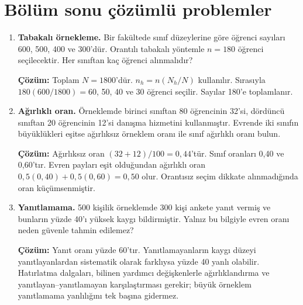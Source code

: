 \section{Bölüm sonu çözümlü problemler}

\begin{enumerate}
  \item \textbf{Tabakalı örnekleme.} Bir fakültede sınıf düzeylerine göre öğrenci sayıları 600, 500, 400 ve 300'dür. Orantılı tabakalı yöntemle $n=180$ öğrenci seçilecektir. Her sınıftan kaç öğrenci alınmalıdır?

  \textbf{Çözüm:} Toplam $N=1800$'dür. $n_h=n(N_h/N)$ kullanılır. Sırasıyla $180(600/1800)=60$, 50, 40 ve 30 öğrenci seçilir. Sayılar 180'e toplamlanır.

  \item \textbf{Ağırlıklı oran.} Örneklemde birinci sınıftan 80 öğrencinin 32'si, dördüncü sınıftan 20 öğrencinin 12'si danışma hizmetini kullanmıştır. Evrende iki sınıfın büyüklükleri eşitse ağırlıksız örneklem oranı ile sınıf ağırlıklı oranı bulun.

  \textbf{Çözüm:} Ağırlıksız oran $(32+12)/100=0{,}44$'tür. Sınıf oranları 0,40 ve 0,60'tır. Evren payları eşit olduğundan ağırlıklı oran $0{,}5(0{,}40)+0{,}5(0{,}60)=0{,}50$ olur. Orantısız seçim dikkate alınmadığında oran küçümsenmiştir.

  \item \textbf{Yanıtlamama.} 500 kişilik örneklemde 300 kişi ankete yanıt vermiş ve bunların yüzde 40'ı yüksek kaygı bildirmiştir. Yalnız bu bilgiyle evren oranı neden güvenle tahmin edilemez?

  \textbf{Çözüm:} Yanıt oranı yüzde 60'tır. Yanıtlamayanların kaygı düzeyi yanıtlayanlardan sistematik olarak farklıysa yüzde 40 yanlı olabilir. Hatırlatma dalgaları, bilinen yardımcı değişkenlerle ağırlıklandırma ve yanıtlayan--yanıtlamayan karşılaştırması gerekir; büyük örneklem yanıtlamama yanlılığını tek başına gidermez.
\end{enumerate}